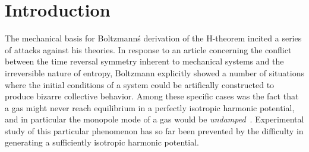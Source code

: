 \documentclass[%
 reprint,
 amsmath,amssymb,
 aps,
]{revtex4-1}
\begin{document}

\section{\label{sec:level1} Introduction}


The mechanical basis for Boltzmann\'s derivation of the H-theorem incited a series of attacks against his theories.
In response to an article concerning the conflict between the time reversal symmetry inherent to mechanical systems and the irreversible nature of entropy, Boltzmann explicitly showed a number of situations where the initial conditions of a system could be artifically constructed to produce bizarre collective behavior.
Among these specific cases was the fact that a gas might never reach equilibrium in a perfectly isotropic harmonic potential, and in particular the monopole mode of a gas would be \textit{undamped}~\cite{Cercignani1988}.
Experimental study of this particular phenomenon has so far been prevented by the difficulty in generating a sufficiently isotropic harmonic potential. 
\end{document}
